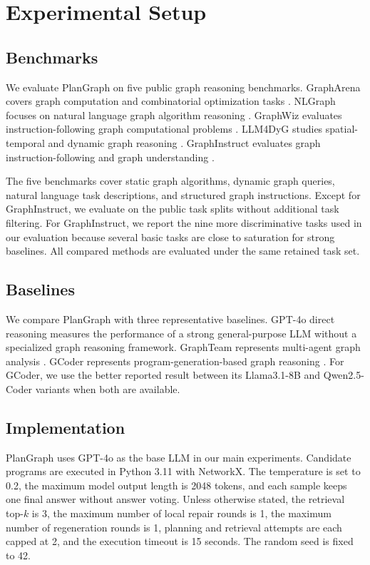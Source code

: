 \documentclass[pdflatex,iicol,sn-mathphys-num]{sn-jnl}
\theoremstyle{thmstyleone}
\theoremstyle{thmstyletwo}
\theoremstyle{thmstylethree}
\begin{document}
\section{Experimental Setup}\label{sec:setup}

\subsection{Benchmarks}

We evaluate PlanGraph on five public graph reasoning benchmarks. GraphArena covers graph computation and combinatorial optimization tasks \cite{tang2025grapharena}. NLGraph focuses on natural language graph algorithm reasoning \cite{chen2024nlgraph}. GraphWiz evaluates instruction-following graph computational problems \cite{gong2024graphwiz}. LLM4DyG studies spatial-temporal and dynamic graph reasoning \cite{llm4dyg2024}. GraphInstruct evaluates graph instruction-following and graph understanding \cite{graphinstruct2024}.

The five benchmarks cover static graph algorithms, dynamic graph queries, natural language task descriptions, and structured graph instructions. Except for GraphInstruct, we evaluate on the public task splits without additional task filtering. For GraphInstruct, we report the nine more discriminative tasks used in our evaluation because several basic tasks are close to saturation for strong baselines. All compared methods are evaluated under the same retained task set.

\subsection{Baselines}

We compare PlanGraph with three representative baselines. GPT-4o direct reasoning measures the performance of a strong general-purpose LLM without a specialized graph reasoning framework. GraphTeam represents multi-agent graph analysis \cite{li2024graphteam}. GCoder represents program-generation-based graph reasoning \cite{zhang2025gcoder}. For GCoder, we use the better reported result between its Llama3.1-8B and Qwen2.5-Coder variants when both are available.

\subsection{Implementation}

PlanGraph uses GPT-4o as the base LLM in our main experiments. Candidate programs are executed in Python 3.11 with NetworkX. The temperature is set to 0.2, the maximum model output length is 2048 tokens, and each sample keeps one final answer without answer voting. Unless otherwise stated, the retrieval top-$k$ is 3, the maximum number of local repair rounds is 1, the maximum number of regeneration rounds is 1, planning and retrieval attempts are each capped at 2, and the execution timeout is 15 seconds. The random seed is fixed to 42.
\end{document}
